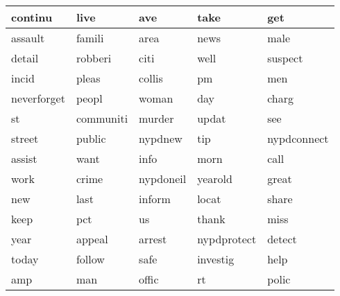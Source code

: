 \begin{longtable}{p{2.5cm}p{2.5cm}p{2.5cm}p{2.5cm}p{2.5cm}}
continu&live&ave&take&get\\ \hline 
assault&famili&area&news&male\\ \hline 
detail&robberi&citi&well&suspect\\ \hline 
incid&pleas&collis&pm&men\\ \hline 
neverforget&peopl&woman&day&charg\\ \hline 
st&communiti&murder&updat&see\\ \hline 
street&public&nypdnew&tip&nypdconnect\\ \hline 
assist&want&info&morn&call\\ \hline 
work&crime&nypdoneil&yearold&great\\ \hline 
new&last&inform&locat&share\\ \hline 
keep&pct&us&thank&miss\\ \hline 
year&appeal&arrest&nypdprotect&detect\\ \hline 
today&follow&safe&investig&help\\ \hline 
amp&man&offic&rt&polic\\ \hline 

\end{longtable}
